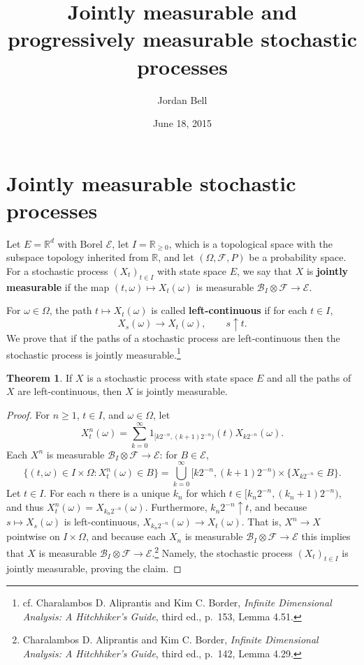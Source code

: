 \documentclass{article}
\theoremstyle{definition}
\newtheorem{theorem}{Theorem}
\theoremstyle{definition}
\begin{document}
\title{Jointly measurable and progressively measurable stochastic processes}
\author{Jordan Bell}
\date{June 18, 2015}

\maketitle

\section{Jointly measurable stochastic processes}
Let $E=\mathbb{R}^d$  with Borel $\mathscr{E}$, 
let $I = \mathbb{R}_{\geq 0}$, which is a topological  space with the subspace topology inherited from $\mathbb{R}$,
and let
$(\Omega,\mathscr{F},P)$ be a probability space.
For a stochastic process $(X_t)_{t \in I}$ with state space $E$,
we say that
$X$ is \textbf{jointly measurable} if the map
$(t,\omega) \mapsto X_t(\omega)$ is measurable $\mathscr{B}_I \otimes \mathscr{F} \to \mathscr{E}$. 

For $\omega \in \Omega$, the path $t \mapsto X_t(\omega)$ is called
\textbf{left-continuous} if 
for each $t \in I$,
\[
X_s(\omega) \to X_t(\omega),\qquad s \uparrow t.
\] 
We prove that if the paths of a stochastic process are left-continuous then the stochastic process
is jointly measurable.\footnote{cf. Charalambos D. Aliprantis and Kim C. Border, {\em Infinite Dimensional Analysis:
A Hitchhiker's Guide}, third ed., p.~153, Lemma 4.51.}

\begin{theorem}
If $X$ is a stochastic process with state space $E$ and  all the paths of $X$ are left-continuous, then $X$ is
jointly measurable.
\end{theorem}
\begin{proof}
For $n \geq 1$, $t \in I$, and  $\omega \in \Omega$, let 
\[
X^n_t(\omega) = \sum_{k=0}^\infty 1_{[k2^{-n}, (k+1)2^{-n})}(t) X_{k 2^{-n}}(\omega).
\]
Each $X^n$ is measurable $\mathscr{B}_I \otimes \mathscr{F} \to \mathscr{E}$:
for $B \in \mathscr{E}$,
\[
\{(t,\omega) \in I \times \Omega: X^n_t(\omega) \in B\}
=\bigcup_{k=0}^\infty [k2^{-n},(k+1)2^{-n}) \times \{X_{k2^{-n}} \in B\}.
\]
Let $t \in I$.
For each $n$ there is a unique $k_n$ for which $t \in [k_n2^{-n},(k_n+1)2^{-n})$, and 
thus $X_t^n(\omega) = X_{k_n 2^{-n}}(\omega)$. Furthermore, $k_n2^{-n} \uparrow t$, and because 
 $s \mapsto X_s(\omega)$ is left-continuous,  $X_{k_n 2^{-n}}(\omega) \to X_t(\omega)$.
That is, 
$X^n \to X$ pointwise on $I \times \Omega$, 
and because each $X_n$ is measurable 
$\mathscr{B}_I \otimes \mathscr{F} \to \mathscr{E}$ this implies that
$X$ is measurable $\mathscr{B}_I \otimes \mathscr{F} \to \mathscr{E}$.\footnote{Charalambos D. Aliprantis and Kim C. Border, {\em Infinite Dimensional Analysis:
A Hitchhiker's Guide}, third ed., p.~142, Lemma 4.29.} Namely, the stochastic process $(X_t)_{t \in I}$ is jointly measurable, proving the claim.
\end{proof}
\end{document}
